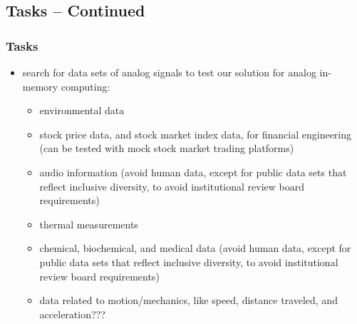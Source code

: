 \documentclass[xcolor={usenames,dvipsnames},hyperref={hyperindex,bookmarks}]{beamer}
\begin{document}



\subsection{Tasks -- Continued}


\begin{frame}
	\frametitle{Tasks}
	
	\begin{itemize}
	\item search for data sets of analog signals to test our solution for analog in-memory computing: %
		\begin{itemize} %
		\item environmental data
		\item stock price data, and stock market index data, for financial engineering (can be tested with mock stock market trading platforms)
		\item audio information (avoid human data, except for public data sets that reflect inclusive diversity, to avoid institutional review board requirements)
		\item thermal measurements
		\item chemical, biochemical, and medical data (avoid human data, except for public data sets that reflect inclusive diversity, to avoid institutional review board requirements)
		\item data related to motion/mechanics, like speed, distance traveled, and acceleration???
		\end{itemize}
	\end{itemize}
	
\end{frame}



%		
\end{document}
